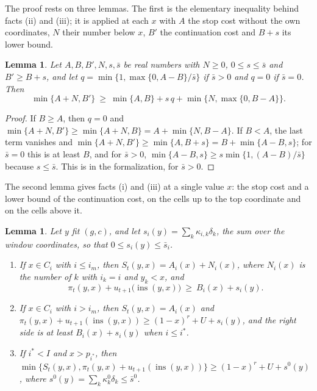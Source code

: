 \documentclass[11pt]{amsart}
\newtheorem{lemma}[theorem]{Lemma}
\theoremstyle{definition}
\numberwithin{equation}{section}
\newcommand{\lean}[1]{\ignorespaces}
\newcommand{\ins}{\operatorname{ins}}
\begin{document}
The proof rests on three lemmas. The first is the elementary inequality behind facts (ii) and (iii); it is applied at each $x$ with $A$ the stop cost without the own coordinates, $N$ their number below $x$, $B'$ the continuation cost and $B+s$ its lower bound.

\begin{lemma}\label{lem:scalar}\lean{Robbins.Cert.SO.scalar_min, Robbins.Cert.SO.scalar_min0}
Let $A,B,B',N,s,\bar s$ be real numbers with $N\ge0$, $0\le s\le\bar s$ and $B'\ge B+s$, and let $q=\min\{1,\max\{0,A-B\}/\bar s\}$ if $\bar s>0$ and $q=0$ if $\bar s=0$. Then
\[
\min\{A+N,B'\}\ \ge\ \min\{A,B\}+s\,q+\min\bigl\{N,\max\{0,B-A\}\bigr\}.
\]
\end{lemma}

\begin{proof}
If $B\ge A$, then $q=0$ and $\min\{A+N,B'\}\ge\min\{A+N,B\}=A+\min\{N,B-A\}$. If $B<A$, the last term vanishes and $\min\{A+N,B'\}\ge\min\{A,B+s\}=B+\min\{A-B,s\}$; for $\bar s=0$ this is at least $B$, and for $\bar s>0$, $\min\{A-B,s\}\ge s\min\{1,(A-B)/\bar s\}$ because $s\le\bar s$. This is  in the formalization, for $\bar s>0$.
\end{proof}

The second lemma gives facts (i) and (iii) at a single value $x$: the stop cost and a lower bound of the continuation cost, on the cells up to the top coordinate and on the cells above it.

\begin{lemma}\label{lem:cellbound}\lean{Robbins.Cert.SO.cont_ge_cell, Robbins.Cert.SO.relaxStop_cell, Robbins.Cert.SO.drop_ge_cell, Robbins.Cert.SO.ceilR_ins_cell, Robbins.Cert.SO.relaxStop_tail, Robbins.Cert.SO.cont_tail}
Let $y$ fit $(g,c)$, and let $s_i(y)=\sum_k\kappa_{i,k}\delta_k$, the sum over the window coordinates, so that $0\le s_i(y)\le \bar s_i$.
\begin{enumerate}[label=(\alph*)]
\item If $x\in C_i$ with $i\le i_m$, then $S_t(y,x)=A_i(x)+N_i(x)$, where $N_i(x)$ is the number of $k$ with $i_k=i$ and $y_k<x$, and
\[
\pi_t(y,x)+u_{t+1}\bigl(\ins(y,x)\bigr)\ \ge\ B_i(x)+s_i(y).
\]
\item If $x\in C_i$ with $i>i_m$, then $S_t(y,x)=A_i(x)$ and $\pi_t(y,x)+u_{t+1}(\ins(y,x))\ge(1-x)^r+U+s_i(y)$, and the right side is at least $B_i(x)+s_i(y)$ when $i\le i^*$.
\item If $i^*<I$ and $x>p_{i^*}$, then $\min\{S_t(y,x),\pi_t(y,x)+u_{t+1}(\ins(y,x))\}\ge(1-x)^r+U+s^0(y)$, where $s^0(y)=\sum_k\kappa^0_k\delta_k\le \bar s^0$.
\end{enumerate}
\end{lemma}
\end{document}

